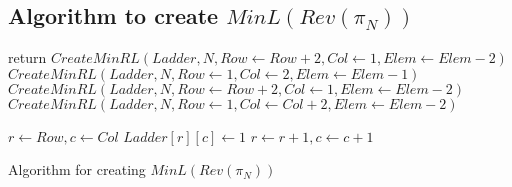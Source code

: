 \subsection{Algorithm to create $MinL(Rev(\pi_{N}))$}
\begin{algorithm}
    \begin{algorithmic}[1]
                \State \small{return}
            \EndIf
                \State \small{$CreateMinRL(Ladder, N, Row \gets Row+2, Col \gets 1, Elem \gets Elem-2)$}
                \State \small{$CreateMinRL(Ladder, N, Row \gets 1, Col \gets 2, Elem \gets Elem-1)$}
            \Else 
                    \State \small{$CreateMinRL(Ladder, N, Row \gets Row+2, Col \gets 1, Elem \gets Elem-2)$}
                \Else 
                    \State \small{$CreateMinRL(Ladder, N, Row \gets 1, Col \gets Col+2, Elem \gets Elem-2)$}

                \EndIf
            \EndIf

        \State \small{$r \gets Row, c \gets Col$}
            \State \small{$Ladder[r][c] \gets 1$}
            \State \small{$r \gets r+1,c \gets c+1$}
        \EndFor
        \EndFunction
    \end{algorithmic}
    \caption{Algorithm for creating $MinL(Rev(\pi_{N}))$}
    \label{Alg:MinRevLadder}
\end{algorithm}

